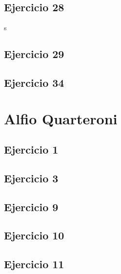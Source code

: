 \documentclass[12pt]{article}
\begin{document}
\subsection{Ejercicio 28}
s %

\subsection{Ejercicio 29}


\subsection{Ejercicio 34}

\section{Alfio Quarteroni}
% 
\subsection{Ejercicio 1}

\subsection{Ejercicio 3}

\subsection{Ejercicio 9}

\subsection{Ejercicio 10}

\subsection{Ejercicio 11}
\end{document}
